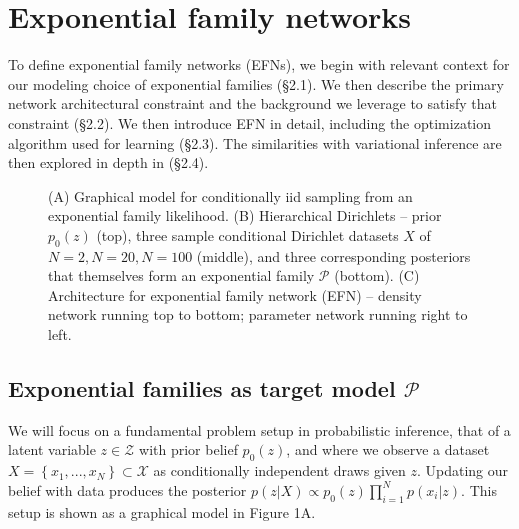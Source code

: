 \documentclass[twoside]{article}
\begin{document}
\section{Exponential family networks}

To define exponential family networks (EFNs), we begin with relevant context for our modeling choice of exponential families (\S2.1).  We then describe the primary network architectural constraint and the background we leverage to satisfy that constraint (\S2.2). We then introduce EFN in detail, including the optimization algorithm used for learning (\S2.3).  The similarities with variational inference are then explored in depth in (\S2.4).

\begin{figure}
  \resizebox{.45\linewidth}{!}{\centering \parbox{\linewidth}{}}


  \caption{(A) Graphical model for conditionally iid sampling from an exponential family likelihood.  (B) Hierarchical Dirichlets -- prior $p_0(z)$ (top), three sample conditional Dirichlet datasets $X$ of $N=2, N=20, N=100$ (middle), and three corresponding posteriors that themselves form an exponential family $\mathcal{P}$ (bottom).  (C) Architecture for exponential family network (EFN) -- density network running top to bottom; parameter network running right to left.}
\end{figure}

\subsection{Exponential families as target model $\mathcal{P}$}

We will focus on a fundamental problem setup in probabilistic inference, that of a latent variable $z \in \mathcal{Z}$ with prior belief $p_0(z)$, and where we observe a dataset $X = \left\{x_1,...,x_N\right\} \subset \mathcal{X}$ as conditionally independent draws given $z$.   Updating our belief with data produces the posterior $p(z | X) \propto p_0(z) \prod_{i=1}^N p(x_i | z)$.  This setup is shown as a graphical model in Figure 1A.
\end{document}
